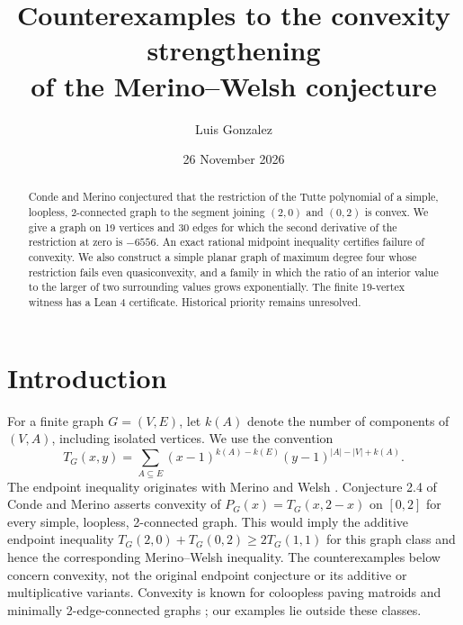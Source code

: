 \documentclass[11pt]{article}
\title{Counterexamples to the convexity strengthening\\of the Merino--Welsh conjecture}
\author{Luis Gonzalez}
\date{26 November 2026}
\begin{document}
\maketitle
\begin{abstract}
Conde and Merino conjectured that the restriction of the Tutte polynomial of a simple, loopless, 2-connected graph to the segment joining $(2,0)$ and $(0,2)$ is convex. We give a graph on 19 vertices and 30 edges for which the second derivative of the restriction at zero is $-6556$. An exact rational midpoint inequality certifies failure of convexity. We also construct a simple planar graph of maximum degree four whose restriction fails even quasiconvexity, and a family in which the ratio of an interior value to the larger of two surrounding values grows exponentially. The finite 19-vertex witness has a Lean 4 certificate. Historical priority remains unresolved.
\end{abstract}
\section{Introduction}
For a finite graph $G=(V,E)$, let $k(A)$ denote the number of components of $(V,A)$, including isolated vertices. We use the convention
\[
T_G(x,y)=\sum_{A\subseteq E}(x-1)^{k(A)-k(E)}(y-1)^{|A|-|V|+k(A)}.
\]
The endpoint inequality originates with Merino and Welsh \cite{MW}. Conjecture 2.4 of Conde and Merino \cite{CM} asserts convexity of $P_G(x)=T_G(x,2-x)$ on $[0,2]$ for every simple, loopless, 2-connected graph. This would imply the additive endpoint inequality $T_G(2,0)+T_G(0,2)\ge 2T_G(1,1)$ for this graph class and hence the corresponding Merino--Welsh inequality. The counterexamples below concern convexity, not the original endpoint conjecture or its additive or multiplicative variants. Convexity is known for coloopless paving matroids \cite{CL} and minimally 2-edge-connected graphs \cite{Ok}; our examples lie outside these classes.
\end{document}
